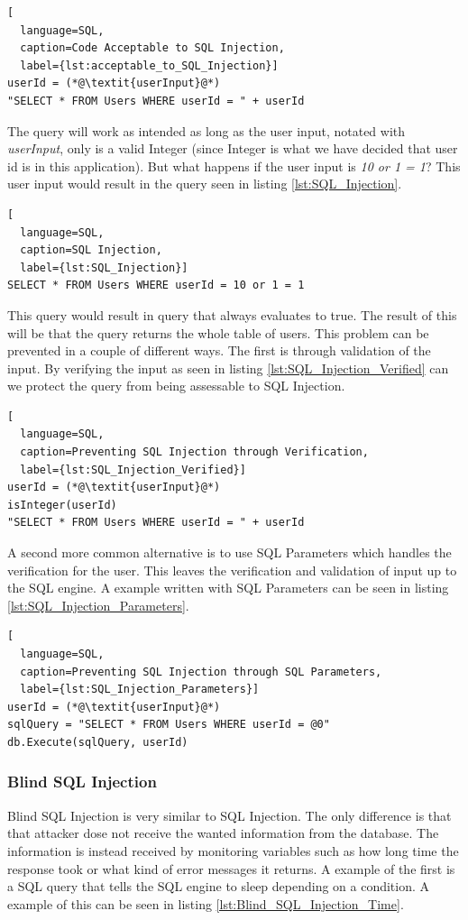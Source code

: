 \hfill
\begin{lstlisting}[
  language=SQL,
  caption=Code Acceptable to SQL Injection,
  label={lst:acceptable_to_SQL_Injection}]
userId = (*@\textit{userInput}@*)
"SELECT * FROM Users WHERE userId = " + userId
\end{lstlisting}
\hfill

The query will work as intended as long as the user input, notated with \textit{userInput}, only is a valid Integer (since Integer is what we have decided that user id is in this application). But what happens if the user input is \textit{10 or 1 = 1}? This user input would result in the query seen in listing \ref{lst:SQL_Injection}.

\hfill
\begin{lstlisting}[
  language=SQL,
  caption=SQL Injection,
  label={lst:SQL_Injection}]
SELECT * FROM Users WHERE userId = 10 or 1 = 1
\end{lstlisting}
\hfill

This query would result in query that always evaluates to true. The result of this will be that the query returns the whole table of users. This problem can be prevented in a couple of different ways. The first is through validation of the input. By verifying the input as seen in listing \ref{lst:SQL_Injection_Verified} can we protect the query from being assessable to SQL Injection.

\hfill
\begin{lstlisting}[
  language=SQL,
  caption=Preventing SQL Injection through Verification,
  label={lst:SQL_Injection_Verified}]
userId = (*@\textit{userInput}@*)
isInteger(userId)
"SELECT * FROM Users WHERE userId = " + userId
\end{lstlisting}
\hfill

A second more common alternative is to use SQL Parameters which handles the verification for the user. This leaves the verification and validation of input up to the SQL engine. A example written with SQL Parameters can be seen in listing \ref{lst:SQL_Injection_Parameters}.

\hfill
\begin{lstlisting}[
  language=SQL,
  caption=Preventing SQL Injection through SQL Parameters,
  label={lst:SQL_Injection_Parameters}]
userId = (*@\textit{userInput}@*)
sqlQuery = "SELECT * FROM Users WHERE userId = @0"
db.Execute(sqlQuery, userId)
\end{lstlisting}


\subsubsection{Blind SQL Injection}
Blind SQL Injection is very similar to SQL Injection. The only difference is that that attacker dose not receive the wanted information from the database. The information is instead received by monitoring variables such as how long time the response took or what kind of error messages it returns. A example of the first is a SQL query that tells the SQL engine to sleep depending on a condition. A example of this can be seen in listing \ref{lst:Blind_SQL_Injection_Time}. \parencite{JustinClarke-Salt2009SIAa, Secure_Web} 


